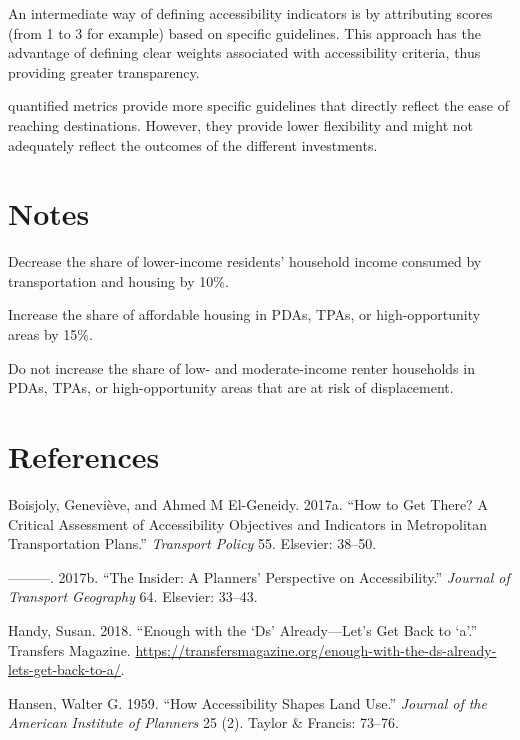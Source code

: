 \documentclass[12pt,]{article}
\begin{document}
An intermediate way of defining accessibility indicators is by
attributing scores (from 1 to 3 for example) based on specific
guidelines. This approach has the advantage of defining clear weights
associated with accessibility criteria, thus providing greater
transparency.

quantified metrics provide more specific guidelines that directly
reflect the ease of reaching destinations. However, they provide lower
flexibility and might not adequately reflect the outcomes of the
different investments.

\hypertarget{notes}{%
\section{Notes}\label{notes}}

Decrease the share of lower-income residents' household income consumed
by transportation and housing by 10\%.

Increase the share of affordable housing in PDAs, TPAs, or
high-opportunity areas by 15\%.

Do not increase the share of low- and moderate-income renter households
in PDAs, TPAs, or high-opportunity areas that are at risk of
displacement.

\hypertarget{references}{%
\section*{References}\label{references}}

\hypertarget{refs}{}
\leavevmode\hypertarget{ref-boisjoly2017get}{}%
Boisjoly, Geneviève, and Ahmed M El-Geneidy. 2017a. ``How to Get There?
A Critical Assessment of Accessibility Objectives and Indicators in
Metropolitan Transportation Plans.'' \emph{Transport Policy} 55.
Elsevier: 38--50.

\leavevmode\hypertarget{ref-boisjoly2017insider}{}%
---------. 2017b. ``The Insider: A Planners' Perspective on
Accessibility.'' \emph{Journal of Transport Geography} 64. Elsevier:
33--43.

\leavevmode\hypertarget{ref-handy2018enough}{}%
Handy, Susan. 2018. ``Enough with the `Ds' Already---Let's Get Back to
`a'.'' Transfers Magazine.
\url{https://transfersmagazine.org/enough-with-the-ds-already-lets-get-back-to-a/}.

\leavevmode\hypertarget{ref-hansen1959accessibility}{}%
Hansen, Walter G. 1959. ``How Accessibility Shapes Land Use.''
\emph{Journal of the American Institute of Planners} 25 (2). Taylor \&
Francis: 73--76.
\end{document}
